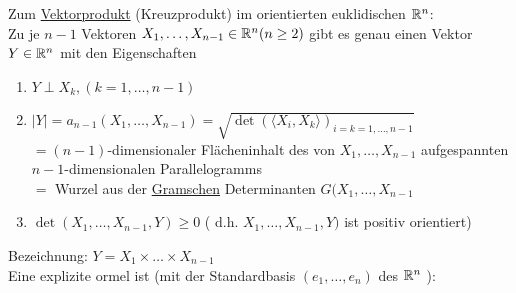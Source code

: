 Zum \uline{Vektorprodukt} (Kreuzprodukt) im orientierten euklidischen \(\mathbb{R}^n\): \\
  Zu je \(n-1\) Vektoren \(X_1, \dots, X_{n-1} \in \mathbb{R}^n (n\ge 2)\) gibt es genau einen Vektor \(Y\in \mathbb{R}^n\) mit den Eigenschaften
  \begin{enumerate}
   \item \(Y \perp X_k, (k = 1, \dots, n-1) \)
   \item \(|Y|=a_{n-1}(X_1, \dots, X_{n-1}) = \sqrt{\det\left(\langle X_i, X_k \rangle\right)_{i=k=1,\dots,n-1}} \) \\
	  \(= (n-1)\)-dimensionaler Flächeninhalt des von \(X_1, \dots, X_{n-1}\) aufgespannten \(n-1\)-dimensionalen Parallelogramms \\
	  \(=\) Wurzel aus der \uline{Gramschen} Determinanten \(G(X_1,\dots, X_{n-1}\)
   \item \(\det (X_1, \dots, X_{n-1}, Y) \ge 0\) ( d.h. \(X_1, \dots, X_{n-1}, Y)\) ist positiv orientiert)
  \end{enumerate}
Bezeichnung: \(Y=X_1 \times \dots \times X_{n-1}\) \\
Eine explizite ormel ist (mit der Standardbasis \((e_1, \dots , e_n)\) des \(\mathbb{R}^n\) ): 
